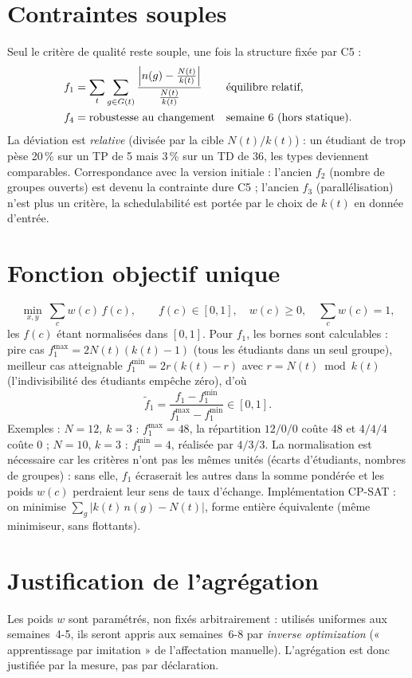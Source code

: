 \documentclass[11pt,a4paper]{article}
\begin{document}
\section{Contraintes souples}
Seul le critère de qualité reste souple, une fois la structure fixée par C5 :
\begin{align}
  f_1 &= \sum_{t} \sum_{g \in G(t)} \frac{\left| n(g) - \frac{N(t)}{k(t)} \right|}{\frac{N(t)}{k(t)}}
    && \text{équilibre relatif,}\notag\\
  f_4 &= \text{robustesse au changement}
    && \text{semaine 6 (hors statique).}\notag
\end{align}
La déviation est \emph{relative} (divisée par la cible $N(t)/k(t)$) : un étudiant de trop pèse 20\,\% sur un TP de 5 mais 3\,\% sur un TD de 36, les types deviennent comparables.
Correspondance avec la version initiale : l'ancien $f_2$ (nombre de groupes ouverts) est devenu la contrainte dure C5 ; l'ancien $f_3$ (parallélisation) n'est plus un critère, la schedulabilité est portée par le choix de $k(t)$ en donnée d'entrée.

\section{Fonction objectif unique}
\begin{equation}
  \min_{x,y} \ \sum_{c} w(c)\, f(c),
  \qquad f(c) \in [0,1],\quad w(c) \ge 0,\quad \sum_{c} w(c) = 1,
\end{equation}
les $f(c)$ étant normalisées dans $[0,1]$. Pour $f_1$, les bornes sont calculables : pire cas $f_1^{\max} = 2 N(t) (k(t)-1)$ (tous les étudiants dans un seul groupe), meilleur cas atteignable $f_1^{\min} = 2 r (k(t) - r)$ avec $r = N(t) \bmod k(t)$ (l'indivisibilité des étudiants empêche zéro), d'où
\[
  \tilde f_1 = \frac{f_1 - f_1^{\min}}{f_1^{\max} - f_1^{\min}} \in [0,1].
\]
Exemples : $N=12$, $k=3$ : $f_1^{\max} = 48$, la répartition $12/0/0$ coûte 48 et $4/4/4$ coûte 0 ; $N=10$, $k=3$ : $f_1^{\min} = 4$, réalisée par $4/3/3$. La normalisation est nécessaire car les critères n'ont pas les mêmes unités (écarts d'étudiants, nombres de groupes) : sans elle, $f_1$ écraserait les autres dans la somme pondérée et les poids $w(c)$ perdraient leur sens de taux d'échange.
Implémentation CP-SAT : on minimise $\sum_g |k(t)\, n(g) - N(t)|$, forme entière équivalente (même minimiseur, sans flottants).

\section{Justification de l'agrégation}
Les poids $w$ sont paramétrés, non fixés arbitrairement : utilisés uniformes aux semaines~4-5, ils seront appris aux semaines~6-8 par \emph{inverse optimization} (« apprentissage par imitation » de l'affectation manuelle). L'agrégation est donc justifiée par la mesure, pas par déclaration.
\end{document}
